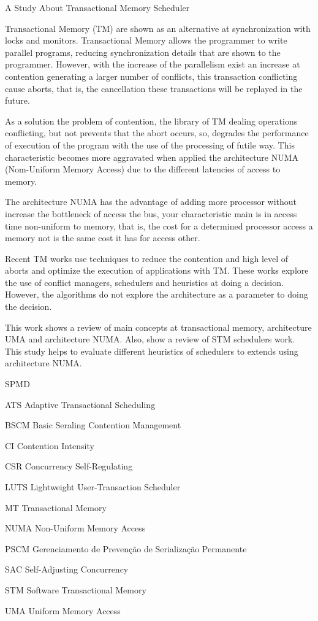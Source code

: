 \documentclass[ti]{texufpel}
\begin{document}
\begin{englishabstract}
  {A Study About Transactional Memory Scheduler}

Transactional Memory (TM) are shown as an alternative at synchronization with locks and monitors. Transactional Memory allows the programmer to write parallel programs, reducing synchronization details that are shown to the programmer. However, with the increase of the parallelism exist an increase at contention generating a larger number of conflicts, this transaction conflicting cause aborts, that is, the cancellation these transactions will be replayed in the future.

As a solution the problem of contention, the library of TM dealing operations conflicting, but not prevents that the abort occurs, so, degrades the performance of execution of the program with the use of the processing of futile way. This characteristic becomes more aggravated when applied the architecture NUMA (Nom-Uniform Memory Access) due to the different latencies of access to memory.

The architecture NUMA has the advantage of adding more processor without increase the bottleneck of access the bus, your characteristic main is in access time non-uniform to memory, that is, the cost for a determined processor access a memory not is the same cost it has for access other.

Recent TM works use techniques to reduce the contention and high level of aborts and optimize the execution of applications with TM. These works explore the use of conflict managers, schedulers and heuristics at doing a decision. However, the algorithms do not explore the architecture as a parameter to doing the decision.

This work shows a review of main concepts at transactional memory, architecture UMA and architecture NUMA. Also, show a review of STM schedulers work. This study helps to evaluate different heuristics of schedulers to extends using architecture NUMA.


\end{englishabstract}

\listoffigures

\begin{listofabbrv}{SPMD}
  \item[ATS] Adaptive Transactional Scheduling
  \item[BSCM] Basic Seraling Contention Management
  \item[CI] Contention Intensity
  \item[CSR] Concurrency Self-Regulating
  \item[LUTS] Lightweight User-Transaction Scheduler
  \item[MT] Transactional Memory
  \item[NUMA] Non-Uniform Memory Access
  \item[PSCM] Gerenciamento de Prevenção de Serialização Permanente
  \item[SAC] Self-Adjusting Concurrency
  \item[STM] Software Transactional Memory
  \item[UMA] Uniform Memory Access
\end{listofabbrv}
\end{document}
